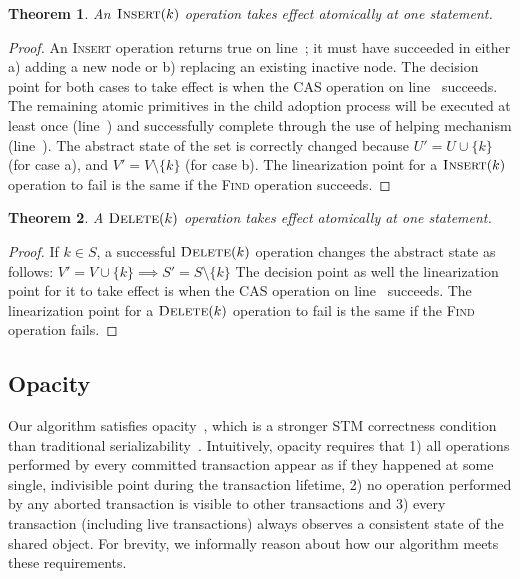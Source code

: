 \documentclass[10pt,conference,compsocconf]{IEEEtran}
\newtheorem{theorem}{Theorem}
\begin{document}
\begin{theorem}
    An $\textsc{Insert}(k)$ operation takes effect atomically at one statement.
\end{theorem}
\begin{proof}
    An \textsc{Insert} operation returns true on line~; it must have succeeded in either a) adding a new node or b) replacing an existing inactive node.
    The decision point for both cases to take effect is when the CAS operation on line~ succeeds.
    The remaining atomic primitives in the child adoption process will be executed at least once (line~) and successfully complete through the use of helping mechanism (line~).
    The abstract state of the set is correctly changed because $U'=U\cup \{ k \}$ (for case a), and $V'=V \setminus \{ k \}$ (for case b).
    The linearization point for a $\textsc{Insert}(k)$ operation to fail is the same if the \textsc{Find} operation succeeds.
\end{proof}

\begin{theorem}
    A $\textsc{Delete}(k)$ operation takes effect atomically at one statement.
\end{theorem}
\begin{proof}
    If $k \in S$, a successful $\textsc{Delete}(k)$ operation changes the abstract state as follows: $V' = V \cup \{k\} \implies S' = S \setminus \{ k\}$
    The decision point as well the linearization point for it to take effect is when the CAS operation on line~ succeeds.
    The linearization point for a $\textsc{Delete}(k)$ operation to fail is the same if the \textsc{Find} operation fails.
\end{proof}

\subsection{Opacity}
Our algorithm satisfies opacity~\cite{guerraoui2008correctness}, which is a stronger STM correctness condition than traditional serializability~\cite{papadimitriou1979serializability}.
Intuitively, opacity requires that 1) all operations performed by every committed transaction appear as if they happened at some single, indivisible point during the transaction lifetime, 2) no operation performed by any aborted transaction is visible to other transactions and 3) every transaction (including live transactions) always observes a consistent state of the shared object.
For brevity, we informally reason about how our algorithm meets these requirements.
\end{document}
